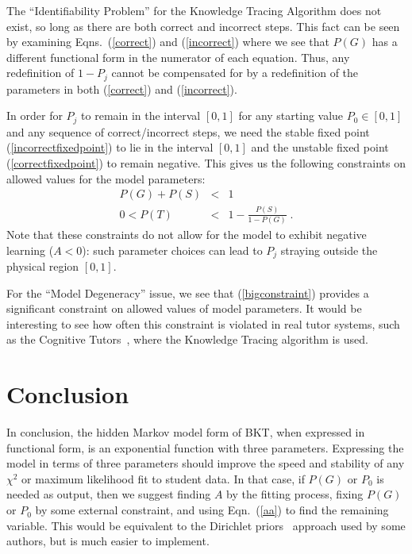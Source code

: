 \documentclass{acmlarge-edm}
\begin{document}
The ``Identifiability Problem'' for the Knowledge Tracing Algorithm
does not exist, so long as there are both correct and incorrect steps.
This fact can be seen by examining Eqns.~(\ref{correct}) and (\ref{incorrect})
where we see that $P(G)$ has a different functional form in
the numerator of each equation.  Thus, any redefinition of $1-P_j$ 
cannot be compensated for by a redefinition
of the parameters in both  (\ref{correct}) and (\ref{incorrect}).

In order for $P_j$ to remain in the interval $\left[0,1\right]$ 
for any starting value $P_0\in \left[0,1\right]$ and any sequence of 
correct/incorrect steps, 
we need the stable fixed point (\ref{incorrectfixedpoint})
to lie in the interval $\left[0,1\right]$ and the unstable fixed point 
(\ref{correctfixedpoint}) to remain negative.  This gives us the following
constraints on allowed values for the model parameters:
%
\begin{eqnarray}
        P(G)+P(S)&<& 1 \\
        0 < P(T) &<& 1-\frac{P(S)}{1-P(G)}  \; .
        \label{bigconstraint}
\end{eqnarray}
%
Note that these constraints do not allow for the model to
exhibit negative learning ($A<0$):  such parameter
choices can lead to $P_j$ straying outside the physical
region $\left[0,1\right]$.

For the ``Model Degeneracy'' issue, we see that (\ref{bigconstraint})
provides a significant constraint on allowed values of model parameters.
It would be interesting to see how often this constraint is 
violated in real tutor systems, such as the 
Cognitive Tutors~\cite{ritter_cognitive_2007}, where the Knowledge
Tracing algorithm is used.


\section{Conclusion}


In conclusion, the hidden Markov model form of BKT, when expressed
in functional form, is an exponential function with three parameters.
Expressing the model in terms of three parameters should 
improve the speed and stability of any $\chi^2$ or maximum likelihood 
fit to student data.  In that case, if $P(G)$ or
$P_0$ is needed as output, then we suggest finding $A$ by
the fitting process,  fixing $P(G)$ or $P_0$ by some 
external constraint, and using Eqn.~(\ref{aa}) to find the remaining
variable.
This would be equivalent to the Dirichlet 
priors~\cite{beck_identifiability:_2007} approach used by
some authors, but is much easier to implement.
\end{document}

